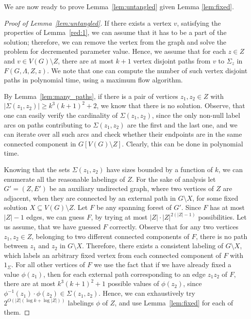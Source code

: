 \documentclass[11pt]{article}
\theoremstyle{definition}
\begin{document}
We are now ready to prove Lemma~\ref{lem:untangled} given Lemma \ref{lem:fixed}.

\begin{proof}[Proof of Lemma~\ref{lem:untangled}]
If there exists a vertex $v$, satisfying the properties of Lemma~\ref{red:1},
we can assume that it has to be a part of the solution; therefore,
we can remove the vertex from the graph and solve the problem
for decremented parameter value.
Hence, we assume that for each $z \in Z$ and $v \in V(G) \setminus Z$,
there are at most $k+1$ vertex disjoint paths from $v$ to $\Sigma_z$ in $F(G,\Lambda,Z,z)$.
We note that one can compute the number of such vertex disjoint paths in polynomial time, using 
a maximum flow algorithm.

By Lemma~\ref{lem:many_paths}, if there is a pair of vertices $z_1,z_2 \in Z$ with $|\Sigma(z_1,z_2)| \ge k^3(k+1)^2+2$, 
we know that there is no solution.
Observe, that one can easily verify the cardinality of $\Sigma(z_1,z_2)$, since the only
non-null label arcs on paths contributing to $\Sigma(z_1,z_2)$ are the first and the last one,
and we can iterate over all such arcs and check whether their endpoints are in the same connected component in $G[V(G) \setminus Z]$.
Clearly, this can be done in polynomial time.

Knowing that the sets $\Sigma(z_1,z_2)$ have sizes bounded by a function of $k$,
we can enumerate all the reasonable labelings of $Z$.
For the sake of analysis let $G'=(Z,E')$ be an auxiliary undirected graph,
where two vertices of $Z$ are adjacent, when they are connected by an external path
in $G\setminus X$, for some fixed solution $X \subseteq V(G) \setminus Z$.
Let $F$ be any spanning forest of $G'$.
Since $F$ has at most $|Z|-1$ edges, we can guess $F$,
by trying at most $|Z| \cdot |Z|^{2(|Z|-1)}$ possibilities.
Let us assume, that we have guessed $F$ correctly.
Observe that for any two vertices $z_1, z_2 \in Z$,
belonging to two different connected components of $F$,
there is no path between $z_1$ and $z_2$ in $G \setminus X$.
Therefore, there exists a consistent labeling of $G \setminus X$,
which labels an arbitrary fixed vertex from each connected component of $F$ with $1_\Sigma$.
For all other vertices of $F$ we use the fact that if we have already fixed a value $\phi(z_1)$,
then for each external path corresponding to an edge $z_1z_2$ of $F$, there are at most $k^3(k+1)^2+1$ possible 
values of $\phi(z_2)$, since $\phi^{-1}(z_1) \cdot \phi(z_2) \in \Sigma(z_1,z_2)$.
Hence, we can exhaustively try $2^{O(|Z|(\log k + \log |Z|))}$ labelings $\phi$ of $Z$,
and use Lemma~\ref{lem:fixed} for each of them.
\end{proof}
\end{document}
